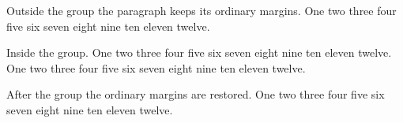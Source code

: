 \nopagenumbers
{}
\hyphenchar{}
\parindent20pt
Outside the group the paragraph keeps its ordinary margins.
One two three four five six seven eight nine ten eleven twelve.
\par
{\narrower
Inside the group.
One two three four five six seven eight nine ten eleven twelve.
One two three four five six seven eight nine ten eleven twelve.
\par}
After the group the ordinary margins are restored.
One two three four five six seven eight nine ten eleven twelve.
\par\bye
